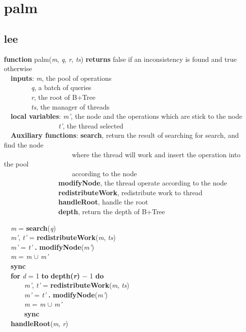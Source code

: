 \documentclass[]{article}
\date{}
\begin{document}
\section{palm}\label{palm}

\subsection{lee}\label{lee}

\textbf{function} palm(\emph{m}, \emph{q}, \emph{r}, \emph{ts})
\textbf{returns} false if an inconsistency is found and true otherwise\\
 \textbf{inputs}: \emph{m}, the pool of operations\\
    \emph{q}, a batch of queries\\
    \emph{r}, the root of B+Tree\\
    \emph{ts}, the manager of threads\\
 \textbf{local variables}: \emph{m'}, the node and the operations which
are stick to the node\\
        \emph{t'}, the thread selected\\
 \textbf{Auxiliary functions}: \textbf{search}, return the result of
searching for search, and find the node\\
          where the thread will work and insert the operation into the
pool\\
          according to the node\\
        \textbf{modifyNode}, the thread operate according to the node\\
        \textbf{redistributeWork}, redistribute work to thread\\
        \textbf{handleRoot}, handle the root\\
        \textbf{depth}, return the depth of B+Tree

 \emph{m} = \textbf{search}(\emph{q})\\
 \emph{m'}, \emph{t'} = \textbf{redistributeWork}(\emph{m}, \emph{ts})\\
 \emph{m'} = \emph{t'} \textbf{.} \textbf{modifyNode}(\emph{m'})\\
 \emph{m} = \emph{m} $\cup$ \emph{m'}\\
 \textbf{sync}\\
 \textbf{for} \emph{d} = 1 \textbf{to} \textbf{depth(\emph{r})} − 1
\textbf{do}\\
   \emph{m'}, \emph{t'} = \textbf{redistributeWork}(\emph{m},
\emph{ts})\\
   \emph{m'} = \emph{t'} \textbf{.} \textbf{modifyNode}(\emph{m'})\\
   \emph{m} = \emph{m} $\cup$ \emph{m'}\\
   \textbf{sync}\\
 \textbf{handleRoot}(\emph{m}, \emph{r})
\end{document}
